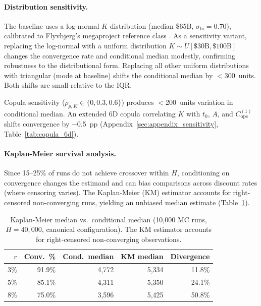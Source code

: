 \documentclass[preprint,12pt]{elsarticle}
\begin{document}
\paragraph{Distribution sensitivity.} The baseline uses a log-normal $K$ distribution (median \$65B, $\sigma_{\ln} = 0.70$), calibrated to Flyvbjerg's megaproject reference class \cite{flyvbjerg2014}. As a sensitivity variant, replacing the log-normal with a uniform distribution $K \sim U[\$30\text{B}, \$100\text{B}]$ changes the convergence rate and conditional median modestly, confirming robustness to the distributional form. Replacing all other uniform distributions with triangular (mode at baseline) shifts the conditional median by $<$300~units. Both shifts are small relative to the IQR.

Copula sensitivity ($\rho_{p,K} \in \{0, 0.3, 0.6\}$) produces $<$200~units variation in conditional median. An extended 6D copula correlating $K$ with $t_0$, $A$, and $C_{\mathrm{ops}}^{(1)}$ shifts convergence by $-$0.5~pp (Appendix~\ref{sec:appendix_sensitivity}, Table~\ref{tab:copula_6d}).

\paragraph{Kaplan-Meier survival analysis.} Since 15--25\% of runs do not achieve crossover within $H$, conditioning on convergence changes the estimand and can bias comparisons across discount rates (where censoring varies). The Kaplan-Meier (KM) estimator \cite{kaplan1958} accounts for right-censored non-converging runs, yielding an unbiased median estimate (Table~\ref{tab:kaplan_meier}).

\begin{table}[htbp]
\centering
\caption{Kaplan-Meier median vs.\ conditional median (10{,}000 MC runs, $H = 40{,}000$, canonical configuration). The KM estimator accounts for right-censored non-converging observations.}
\label{tab:kaplan_meier}
\small
\begin{tabular}{@{}rrrrr@{}}
\toprule
$r$ & Conv.\ \% & Cond.\ median & KM median & Divergence \\
\midrule
3\%  & 91.9\% & 4{,}772 & 5{,}334  & 11.8\% \\
5\%  & 85.1\% & 4{,}311 & 5{,}350  & 24.1\% \\
8\%  & 75.0\% & 3{,}596 & 5{,}425  & 50.8\% \\
\bottomrule
\end{tabular}
\end{table}
\end{document}
